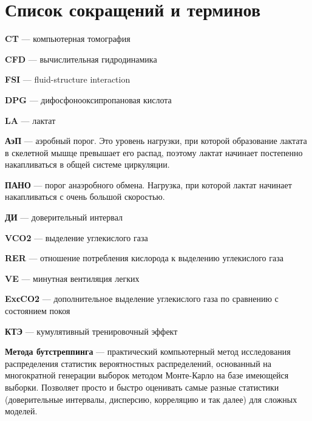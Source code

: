 \clearpage
{}
{}
\listoffigures									%
\newpage

\clearpage
{}
{}
\listoftables									%
\newpage

\clearpage
\chapter*{Список сокращений и терминов} \label{AbrList}

\textbf{CT} --- компьютерная томография

\textbf{CFD} --- вычислительная гидродинамика

\textbf{FSI} --- fluid-structure interaction

\textbf{DPG} --- дифосфонооксипропановая кислота

\textbf{LA} --- лактат

\textbf{АэП} --- аэробный порог. Это уровень нагрузки, при которой образование лактата в скелетной мышце превышает его распад, поэтому лактат начинает постепенно накапливаться в общей системе циркуляции.

\textbf{ПАНО} --- порог анаэробного обмена. Нагрузка, при которой лактат начинает накапливаться с очень большой скоростью.

\textbf{ДИ} --- доверительный интервал

\textbf{VCO2} --- выделение углекислого газа

\textbf{RER} --- отношение потребления кислорода к выделению углекислого газа

\textbf{VE} --- минутная вентиляция легких

\textbf{ExсCO2} --- дополнительное выделение углекислого газа по сравнению с состоянием покоя

\textbf{КТЭ} --- кумулятивный тренировочный эффект 

\textbf{Метода бутстреппинга} --- практический компьютерный метод исследования распределения статистик вероятностных распределений, основанный на многократной генерации выборок методом Монте-Карло на базе имеющейся выборки. Позволяет просто и быстро оценивать самые разные статистики (доверительные интервалы, дисперсию, корреляцию и так далее) для сложных моделей.

\newpage